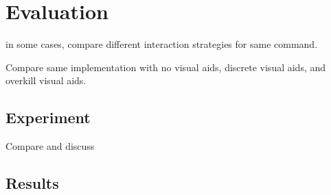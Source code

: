 

\chapter{Evaluation}

in some cases, compare different interaction strategies for same command.

Compare same implementation with no visual aids, discrete visual aids, and overkill visual aids.

\section{Experiment}

Compare and discuss

\section{Results}